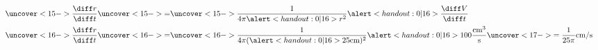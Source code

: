 \begin{frame}
\begin{example}
\begin{columns}[c]
\begin{align*}
{}\\%
\uncover<15->{%
\frac{\diff r}{\diff t}%
}%
& \uncover<15->{ = } %
\uncover<15->{%
\frac{1}{4\pi \alert<handout:0| 16>{r}^2}\alert<handout:0| 16>{\frac{\diff V}{\diff t}}%
}\\%
\uncover<16->{%
\frac{\diff r}{\diff t}%
}%
& \uncover<16->{ = } %
\uncover<16->{%
\frac{1}{4\pi (\alert<handout:0| 16>{25 \textrm{cm}})^2}\alert<handout:0| 16>{100 \frac{\textrm{cm}^3}{\textrm{s}}} \uncover<17->{ = \frac{1}{25\pi}\textrm{cm}/\textrm{s}}%
}%
\end{align*}
\end{columns}
\end{example}
\end{frame}
